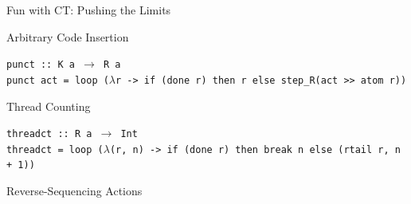 \documentclass{beamer}
\begin{document}
\begin{frame}{Fun with CT: Pushing the Limits}

\begin{structure}{Arbitrary Code Insertion}

\begin{onlinebox}{11cm}

\begin{scriptsize}
\begin{flushleft}

\begin{texttt}
\texttt{punct :: K a $\rightarrow$ R a\\}
\texttt{punct act = loop ($\lambda$r -> if (done r) then r else step\_R(act >> atom r))}\\
\end{texttt}

\end{flushleft}
\end{scriptsize}

\end{onlinebox}
\end{structure}


\begin{structure}{Thread Counting}

\begin{onlinebox}{11.5cm}

\begin{scriptsize}
\begin{flushleft}

\texttt{threadct :: R a $\rightarrow$ Int}\\
\texttt{threadct = loop ($\lambda$(r, n) -> if (done r) then break n else (rtail r, n + 1))}\\

\end{flushleft}
\end{scriptsize}

\end{onlinebox}

\end{structure}


\begin{center}

\begin{structure}{Reverse-Sequencing Actions}
\begin{onlinebox}{9cm}

\begin{scriptsize}
\begin{flushleft}


\end{flushleft}
\end{scriptsize}
\end{onlinebox}
\end{structure}
\end{center}
\end{frame}
\end{document}

